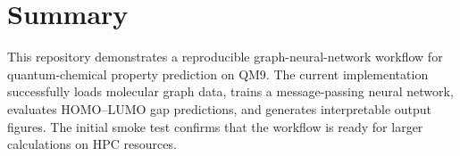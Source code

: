 \documentclass[11pt]{article}
\begin{document}
\section{Summary}

This repository demonstrates a reproducible graph-neural-network workflow for quantum-chemical property prediction on QM9. The current implementation successfully loads molecular graph data, trains a message-passing neural network, evaluates HOMO--LUMO gap predictions, and generates interpretable output figures. The initial smoke test confirms that the workflow is ready for larger calculations on HPC resources.
\end{document}

